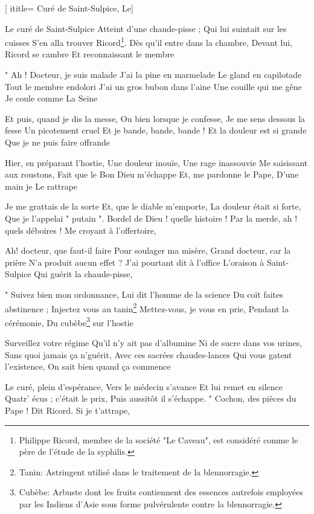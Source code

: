  [
ititle= {Curé de Saint-Sulpice, Le}]


\beginverse
Le curé de Saint-Sulpice
Atteint d'une chaude-pisse ;
Qui lui suintait sur les cuisses
S'en alla trouver Ricord\footnote {Philippe Ricord, membre de la société "Le Caveau", est considéré comme le père de l'étude de la syphilis.}.
Dès qu'il entre dans la chambre,
Devant lui, Ricord se cambre
Et reconnaissant le membre
\endverse

\beginverse
" Ah ! Docteur, je suis malade
J'ai la pine en marmelade
Le gland en capilotade
Tout le membre endolori
J'ai un gros bubon dans l'aine
Une couille qui me gêne
Je coule comme La Seine
\endverse

\beginverse
Et puis, quand je dis la messe,
Ou bien lorsque je confesse,
Je me sens dessous la fesse
Un picotement cruel
Et je bande, bande, bande !
Et la douleur est si grande
Que je ne puis faire offrande
\endverse

\beginverse
Hier, en préparant l'hostie,
Une douleur inouïe,
Une rage inassouvie
Me saisissant aux roustons,
Fait que le Bon Dieu m'échappe
Et, me pardonne le Pape,
D'une main je Le rattrape
\endverse

\beginverse
Je me grattais de la sorte
Et, que le diable m'emporte,
La douleur était si forte,
Que je l'appelai " putain ".
Bordel de Dieu ! quelle histoire !
Par la merde, ah ! quels déboires !
Me croyant à l'offertoire,
\endverse

\beginverse
Ah! docteur, que faut-il faire
Pour soulager ma misère,
Grand docteur, car la prière
N'a produit aucun effet ?
J'ai pourtant dit à l'office
L'oraison à Saint-Sulpice
Qui guérit la chaude-pisse,
\endverse

\beginverse
" Suivez bien mon ordonnance,
Lui dit l'homme de la science
Du coït faites abstinence ;
Injectez vous au tanin\footnote {Tanin: Astringent utilisé dans le traitement de la blennorragie.}
Mettez-vous, je vous en prie,
Pendant la cérémonie,
Du cubèbe\footnote {Cubèbe: Arbuste dont les fruits contiennent des essences autrefois employées par les Indiens d'Asie sous forme pulvérulente contre la blennorragie.} sur l'hostie
\endverse

\beginverse
Surveillez votre régime
Qu'il n'y ait pas d'albumine
Ni de sucre dans vos urines,
Sans quoi jamais ça n'guérit,
Avec ces sacrées chaudes-lances
Qui vous gatent l'existence,
On sait bien quand ça commence
\endverse

\beginverse
Le curé, plein d'espérance,
Vers le médecin s'avance
Et lui remet en silence
Quatr' écus ; c'était le prix,
Puis aussitôt il s'échappe.
" Cochon, des pièces du Pape !
Dit Ricord. Si je t'attrape,
\endverse

\endsong